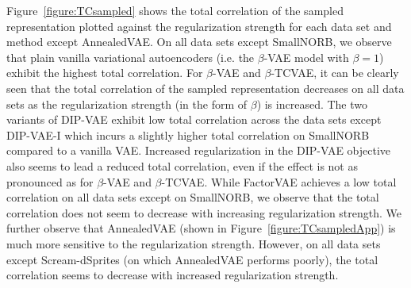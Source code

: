 Figure~\ref{figure:TCsampled} shows the total correlation of the sampled representation plotted against the regularization strength for each data set and method except AnnealedVAE.
On all data sets except SmallNORB, we observe that plain vanilla variational autoencoders (i.e. the $\beta$-VAE model with $\beta=1$) exhibit the highest total correlation.
For $\beta$-VAE and $\beta$-TCVAE, it can be clearly seen that the total correlation of the sampled representation decreases on all data sets as the regularization strength (in the form of $\beta$) is increased.
The two variants of DIP-VAE exhibit low total correlation across the data sets except DIP-VAE-I which incurs a slightly higher total correlation on SmallNORB compared to a vanilla VAE.
Increased regularization in the DIP-VAE objective also seems to lead a reduced total correlation, even if the effect is not as pronounced as for $\beta$-VAE and $\beta$-TCVAE.
While FactorVAE achieves a low total correlation on all data sets except on SmallNORB, we observe that the total correlation does not seem to decrease with increasing regularization strength. 
We further observe that AnnealedVAE (shown in Figure~\ref{figure:TCsampledApp}) is much more sensitive to the regularization strength.
However, on all data sets except Scream-dSprites (on which AnnealedVAE performs poorly), the total correlation seems to decrease with increased regularization strength.


